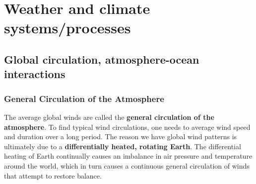 \documentclass[12pt,oneside]{book}
\begin{document}
\part{Weather and climate
systems/processes}\label{part-weather-and-climate-systemsprocesses}

\chapter{Global circulation, atmosphere-ocean interactions}\label{GC}


\section{General Circulation of the
Atmosphere}\label{general-circulation-of-the-atmosphere}

The average global winds are called the \textbf{general circulation of
the atmosphere}. To find typical wind circulations, one needs to average
wind speed and duration over a long period. The reason we have global
wind patterns is ultimately due to a \textbf{differentially heated,
rotating Earth}. The differential heating of Earth continually causes an
imbalance in air pressure and temperature around the world, which in
turn causes a continuous general circulation of winds that attempt to
restore balance.
\end{document}
